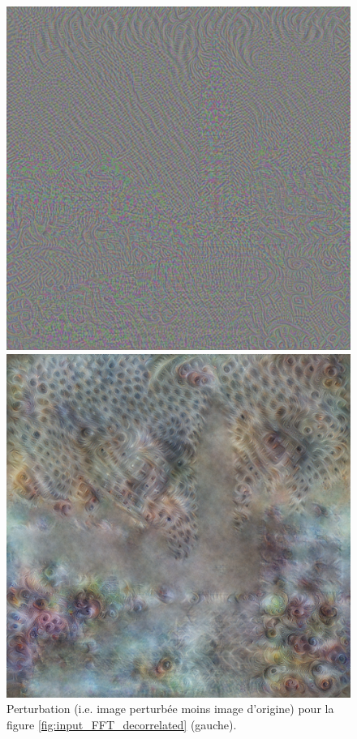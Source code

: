 \documentclass{article}
\begin{document}
\begin{figure}[!h]

      \begin{minipage}[b]{0.4\linewidth}
       \centering
       \includegraphics[width = \linewidth]{img_b_l2_b.png}     
      \end{minipage}
    \hfill
      \begin{minipage}[b]{0.4\linewidth}
       \centering
       \includegraphics[width = \linewidth]{img_b_fft_b.png}     
      \end{minipage}
      \caption{Perturbation (i.e. image perturbée moins image d'origine) pour la figure \ref{fig:input_FFT_decorrelated} (gauche).}
      \label{fig:BigBen_pertubation}
    
    \end{figure}
\end{document}
